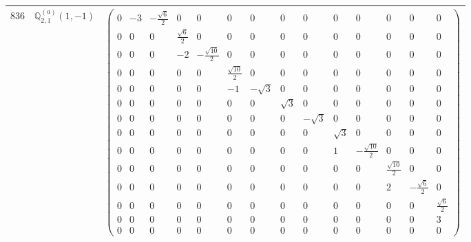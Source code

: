 \documentclass[fleqn,8pt,landscape]{jsarticle}
\begin{document}
\begin{center}
\begin{longtable}{ccc}
$ 836 $ & $ \mathbb{Q}_{2,1}^{(a)}(1,-1) $ & $ \begin{pmatrix} 0 & -3 & - \frac{\sqrt{6}}{2} & 0 & 0 & 0 & 0 & 0 & 0 & 0 & 0 & 0 & 0 & 0 \\ 0 & 0 & 0 & \frac{\sqrt{6}}{2} & 0 & 0 & 0 & 0 & 0 & 0 & 0 & 0 & 0 & 0 \\ 0 & 0 & 0 & -2 & - \frac{\sqrt{10}}{2} & 0 & 0 & 0 & 0 & 0 & 0 & 0 & 0 & 0 \\ 0 & 0 & 0 & 0 & 0 & \frac{\sqrt{10}}{2} & 0 & 0 & 0 & 0 & 0 & 0 & 0 & 0 \\ 0 & 0 & 0 & 0 & 0 & -1 & - \sqrt{3} & 0 & 0 & 0 & 0 & 0 & 0 & 0 \\ 0 & 0 & 0 & 0 & 0 & 0 & 0 & \sqrt{3} & 0 & 0 & 0 & 0 & 0 & 0 \\ 0 & 0 & 0 & 0 & 0 & 0 & 0 & 0 & - \sqrt{3} & 0 & 0 & 0 & 0 & 0 \\ 0 & 0 & 0 & 0 & 0 & 0 & 0 & 0 & 0 & \sqrt{3} & 0 & 0 & 0 & 0 \\ 0 & 0 & 0 & 0 & 0 & 0 & 0 & 0 & 0 & 1 & - \frac{\sqrt{10}}{2} & 0 & 0 & 0 \\ 0 & 0 & 0 & 0 & 0 & 0 & 0 & 0 & 0 & 0 & 0 & \frac{\sqrt{10}}{2} & 0 & 0 \\ 0 & 0 & 0 & 0 & 0 & 0 & 0 & 0 & 0 & 0 & 0 & 2 & - \frac{\sqrt{6}}{2} & 0 \\ 0 & 0 & 0 & 0 & 0 & 0 & 0 & 0 & 0 & 0 & 0 & 0 & 0 & \frac{\sqrt{6}}{2} \\ 0 & 0 & 0 & 0 & 0 & 0 & 0 & 0 & 0 & 0 & 0 & 0 & 0 & 3 \\ 0 & 0 & 0 & 0 & 0 & 0 & 0 & 0 & 0 & 0 & 0 & 0 & 0 & 0 \end{pmatrix} $ \\ \hline

\end{longtable}
\end{center}
\end{document}
